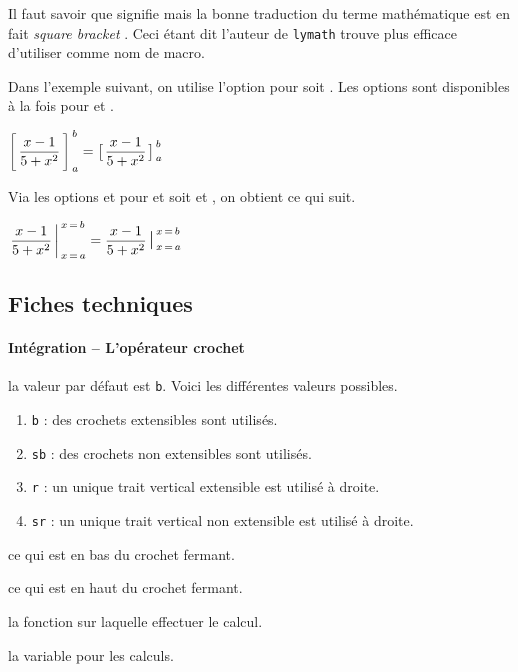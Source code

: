 \documentclass[12pt,a4paper]{article}
\begin{document}
\begin{remark}
	Il faut savoir que  signifie  mais la bonne traduction du terme mathématique est en fait \emph{\og square bracket \fg}. Ceci étant dit l'auteur de \verb+lymath+ trouve plus efficace d'utiliser  comme nom de macro.
\end{remark}





Dans l'exemple suivant, on utilise l'option  pour   soit . Les options sont disponibles à la fois pour  et .


\begin{latexex}
 $\hook*{a}{b}%
        {\dfrac{x - 1}{5 + x^2}}{x}
= \hook*[sb]%
        {a}{b}%
        {\dfrac{x - 1}{5 + x^2}}{x}$
\end{latexex}





Via les options  et  pour  et  soit  et , on obtient ce qui suit.

\begin{latexex}
 $\hook[r] {a}{b}%
           {\dfrac{x - 1}{5 + x^2}}{x}
= \hook[sr]{a}{b}%
           {\dfrac{x - 1}{5 + x^2}}{x}$
\end{latexex}




\subsection{Fiches techniques}

\paragraph{Intégration -- L'opérateur crochet}



\IDoption{} la valeur par défaut est \verb+b+. Voici les différentes valeurs possibles.
\begin{enumerate}
	\item \verb+b+ : des crochets extensibles sont utilisés.

	\item \verb+sb+ : des crochets non extensibles sont utilisés.

	\item \verb+r+ : un unique trait vertical extensible est utilisé à droite.

	\item \verb+sr+ : un unique trait vertical non extensible est utilisé à droite.
\end{enumerate}

 ce qui est en bas du crochet fermant.

 ce qui est en haut du crochet fermant.

 la fonction sur laquelle effectuer le calcul.

 la variable pour les calculs.
\end{document}
